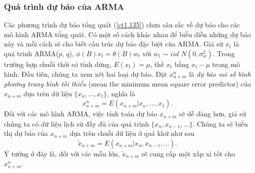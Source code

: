 \documentclass[12pt, a4paper,oneside]{book}
\theoremstyle{definition}
\begin{document}
\subsubsection*{Quá trình dự báo của ARMA}
Các phương trình dự báo tổng quát (\ref{ct1.135}) chưa sâu sắc về dự báo cho các mô hình ARMA tổng quát. Có một số cách khác nhau để biểu diễn những dự báo này và mỗi cách sẽ cho biết cấu trúc dự báo đặc biệt của ARMA. Giả sử $x_t$ là quá trình ARMA($p$, $q$), $\phi(B) x_t = \theta(B) w_t$ với $w_t$ $\sim$ $iid$ $N(0, \sigma^{2}_w)$. Trong trường hợp chuỗi thời có tính dừng, $E(x_t) = \mu$, thế $x_t$ bằng $x_t - \mu$ trong mô hình. Đầu tiên, chúng ta xem xét hai loại dự báo. Đặt $x_{n+m}^{n}$ là \textit{dự báo sai số bình phương trung bình tối thiểu} (mean the minimum mean square error predictor) của $x_{n+m}$ dựa trên dữ liệu $\{x_{n}, \dots, x_{1}\}$, nghĩa là
$$x_{n+m}^{n} = E(x_{n+m}|x_{n}, \dots, x_{1}).$$
Đối với các mô hình ARMA, việc tính toán dự báo $x_{n+m}$ sẽ dễ dàng hơn, giả sử chúng ta có dữ liệu lịch sử đầy đủ của quá trình $\{x_{n}, x_{n-1}, \dots\}$. Chúng ta sẽ biểu thị dự báo của $x_{n+m}$ dựa trên chuỗi dữ liệu ở quá khứ như sau 
$$\tilde{x}_{n+m} = E(x_{n+m}|x_{n}, x_{n-1}, \dots).$$
Ý tưởng ở đây là, đối với các mẫu lớn, $\tilde{x}_{n+m}$ sẽ cung cấp một xấp xỉ tốt cho $x_{n+m}^{n}$.
\end{document}
